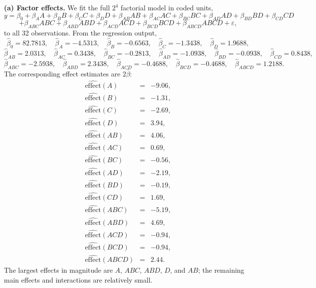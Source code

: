 \documentclass[answers,12pt,addpoints]{exam}
\begin{document}
\begin{solution}

\textbf{(a) Factor effects.}
We fit the full $2^4$ factorial model in coded units,
\[
y = \beta_0 + \beta_A A + \beta_B B + \beta_C C + \beta_D D
    + \beta_{AB} AB + \beta_{AC} AC + \beta_{BC} BC + \beta_{AD} AD + \beta_{BD} BD + \beta_{CD} CD
\]
\[
    + \beta_{ABC} ABC + \beta_{ABD} ABD + \beta_{ACD} ACD + \beta_{BCD} BCD + \beta_{ABCD} ABCD + \varepsilon,
\]
to all 32 observations. From the regression output,
\[
\hat\beta_0 = 82.7813,\quad
\hat\beta_A = -4.5313,\quad
\hat\beta_B = -0.6563,\quad
\hat\beta_C = -1.3438,\quad
\hat\beta_D = 1.9688,
\]
\[
\hat\beta_{AB} = 2.0313,\quad
\hat\beta_{AC} = 0.3438,\quad
\hat\beta_{BC} = -0.2813,\quad
\hat\beta_{AD} = -1.0938,\quad
\hat\beta_{BD} = -0.0938,\quad
\hat\beta_{CD} = 0.8438,
\]
\[
\hat\beta_{ABC} = -2.5938,\quad
\hat\beta_{ABD} = 2.3438,\quad
\hat\beta_{ACD} = -0.4688,\quad
\hat\beta_{BCD} = -0.4688,\quad
\hat\beta_{ABCD} = 1.2188.
\]
The corresponding effect estimates are $2\hat\beta$:
\[
\begin{array}{lcl}
\hat{\text{effect}}(A)   &=& -9.06,\\
\hat{\text{effect}}(B)   &=& -1.31,\\
\hat{\text{effect}}(C)   &=& -2.69,\\
\hat{\text{effect}}(D)   &=& 3.94,\\
\hat{\text{effect}}(AB)  &=& 4.06,\\
\hat{\text{effect}}(AC)  &=& 0.69,\\
\hat{\text{effect}}(BC)  &=& -0.56,\\
\hat{\text{effect}}(AD)  &=& -2.19,\\
\hat{\text{effect}}(BD)  &=& -0.19,\\
\hat{\text{effect}}(CD)  &=& 1.69,\\
\hat{\text{effect}}(ABC) &=& -5.19,\\
\hat{\text{effect}}(ABD) &=& 4.69,\\
\hat{\text{effect}}(ACD) &=& -0.94,\\
\hat{\text{effect}}(BCD) &=& -0.94,\\
\hat{\text{effect}}(ABCD)&=& 2.44.
\end{array}
\]
The largest effects in magnitude are $A$, $ABC$, $ABD$, $D$, and $AB$; the remaining main effects and interactions are relatively small.


\end{solution}
\end{document}
